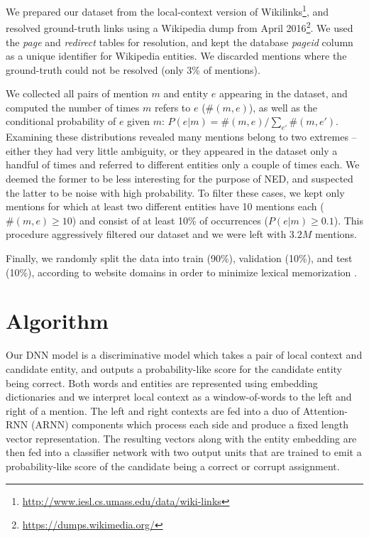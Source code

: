 \documentclass[11pt]{article}
\begin{document}
	We prepared our dataset from the local-context version of Wikilinks\footnote{\url{http://www.iesl.cs.umass.edu/data/wiki-links}}, and resolved ground-truth links using a Wikipedia dump from April 2016\footnote{\url{https://dumps.wikimedia.org/}}. We used the \emph{page} and \emph{redirect} tables for resolution, and kept the database \emph{pageid} column as a unique identifier for Wikipedia entities. We discarded mentions where the ground-truth could not be resolved (only 3\% of mentions).
	
	We collected all pairs of mention $m$ and entity $e$ appearing in the dataset, and computed the number of times $m$ refers to $e$ ($\#(m,e)$), as well as the conditional probability of $e$ given $m$: $P(e|m)=\#(m,e)/\sum_{e'}\#(m,e')$. Examining these distributions revealed many mentions belong to two extremes -- either they had very little ambiguity, or they appeared in the dataset only a handful of times and referred to different entities only a couple of times each. We deemed the former to be less interesting for the purpose of NED, and suspected the latter to be noise with high probability. To filter these cases, we kept only mentions for which at least two different entities have 10 mentions each ($\#(m,e) \ge 10$) and consist of at least 10\% of occurrences ($P(e|m) \ge 0.1$). This procedure aggressively filtered our dataset and we were left with $3.2M$ mentions.
	
	Finally, we randomly split the data into train (90\%), validation (10\%), and test (10\%), according to website domains in order to minimize lexical memorization \cite{levy2015supervised}.
	
	
	\section{Algorithm}
	
	Our DNN model is a discriminative model which takes a pair of local context and candidate entity, and outputs a probability-like score for the candidate entity being correct. Both words and entities are represented using embedding dictionaries and we interpret local context as a window-of-words to the left and right of a mention. The left and right contexts are fed into a duo of Attention-RNN (ARNN) components which process each side and produce a fixed length vector representation. The resulting vectors along with the entity embedding are then fed into a classifier network with two output units that are trained to emit a probability-like score of the candidate being a correct or corrupt assignment. 
	
\end{document}
